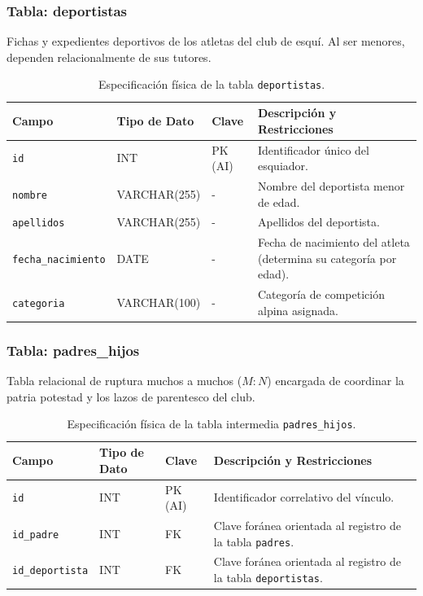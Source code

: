        \subsubsection{Tabla: deportistas}
        Fichas y expedientes deportivos de los atletas del club de esquí. Al ser menores, dependen relacionalmente de sus tutores.

        \begin{table}[htbp]
        \centering
        \scriptsize
        \renewcommand{\arraystretch}{1.0}
        \setlength{\tabcolsep}{4pt}
        \begin{tabularx}{\textwidth}{|l|l|l|X|}
        \hline
        \rowcolor[HTML]{EFEFEF} 
        \textbf{Campo} & \textbf{Tipo de Dato} & \textbf{Clave} & \textbf{Descripción y Restricciones} \\ \hline
        \texttt{id} & INT & PK (AI) & Identificador único del esquiador. \\ \hline
        \texttt{nombre} & VARCHAR(255) & - & Nombre del deportista menor de edad. \\ \hline
        \texttt{apellidos} & VARCHAR(255) & - & Apellidos del deportista. \\ \hline
        \texttt{fecha\_nacimiento} & DATE & - & Fecha de nacimiento del atleta (determina su categoría por edad). \\ \hline
        \texttt{categoria} & VARCHAR(100) & - & Categoría de competición alpina asignada. \\ \hline
        \end{tabularx}
        \caption{Especificación física de la tabla \texttt{deportistas}.}
        \label{tab:dic_deportistas}
        \end{table}

        \subsubsection{Tabla: padres\_hijos}
        Tabla relacional de ruptura muchos a muchos ($M:N$) encargada de coordinar la patria potestad y los lazos de parentesco del club.

        \begin{table}[htbp]
        \centering
        \scriptsize
        \renewcommand{\arraystretch}{1.0}
        \setlength{\tabcolsep}{4pt}
        \begin{tabularx}{\textwidth}{|l|l|l|X|}
        \hline
        \rowcolor[HTML]{EFEFEF} 
        \textbf{Campo} & \textbf{Tipo de Dato} & \textbf{Clave} & \textbf{Descripción y Restricciones} \\ \hline
        \texttt{id} & INT & PK (AI) & Identificador correlativo del vínculo. \\ \hline
        \texttt{id\_padre} & INT & FK & Clave foránea orientada al registro de la tabla \texttt{padres}. \\ \hline
        \texttt{id\_deportista} & INT & FK & Clave foránea orientada al registro de la tabla \texttt{deportistas}. \\ \hline
        \end{tabularx}
        \caption{Especificación física de la tabla intermedia \texttt{padres\_hijos}.}
        \label{tab:dic_padres_hijos}
        \end{table}

